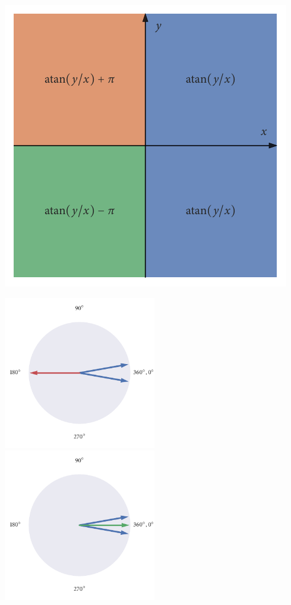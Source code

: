 \documentclass[12pt]{beamer}
\begin{document}
\begin{frame}
    \vspace{0.85cm}
    \centering
    \includegraphics{atan_quadrants.pdf}
\end{frame}

\begin{frame}
    \vspace{0.85cm}
    \centering
    \includegraphics[width=0.5\textwidth]{arith_mean.pdf}%
    \includegraphics[width=0.5\textwidth]{circ_mean.pdf}
\end{frame}
\end{document}
